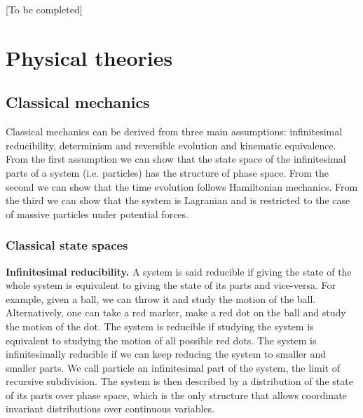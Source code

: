 \documentclass[twocolumn]{article}
\newif\ifextended
\newcommand\fact[2]{\ifextended \emph{#1}.#2 \fi}
\begin{document}
[To be completed]

\section{Physical theories}

\subsection{Classical mechanics}

Classical mechanics can be derived from three main assumptions: infinitesimal reducibility, determinism and reversible evolution and kinematic equivalence. From the first assumption we can show that the state space of the infinitesimal parts of a system (i.e. particles) has the structure of phase space. From the second we can show that the time evolution follows Hamiltonian mechanics. From the third we can show that the system is Lagranian and is restricted to the case of massive particles under potential forces.

\subsubsection{Classical state spaces}

\textbf{Infinitesimal reducibility.} A system is said reducible if giving the state of the whole system is equivalent to giving the state of its parts and vice-versa. For example, given a ball, we can throw it and study the motion of the ball. Alternatively, one can take a red marker, make a red dot on the ball and study the motion of the dot. The system is reducible if studying the system is equivalent to studying the motion of all possible red dots. The system is infinitesimally reducible if we can keep reducing the system to smaller and smaller parts. We call particle an infinitesimal part of the system, the limit of recursive subdivision. The system is then described by a distribution of the state of its parts over phase space, which is the only structure that allows coordinate invariant distributions over continuous variables.

\fact{Composite states are distributions over particle states} {Under infinitesimal reducibility, if $\mathcal{C}$ is the state space of the while system and $\mathcal{S}$ is the state space of the particles, then each state $c \in \mathcal{C}$ for the full system is identified by a distribution $\rho : \mathcal{S} \to \mathbb{R}$ over the states of infinitesimal parts. The function is real to signify that we can associate arbitrarily small amounts to each particle states. The distribution tells us how many particles can be found in each particle state.}
\end{document}
